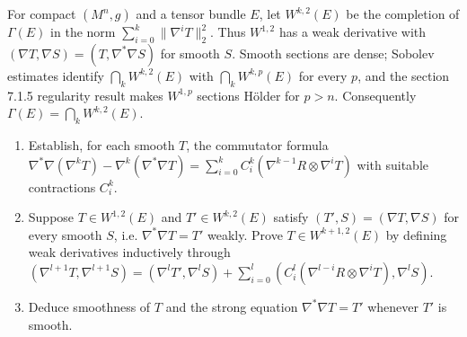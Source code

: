 \begin{remark}
  \label{rem:pet-ch9-exercise-9-6-4}
  For compact $(M^n,g)$ and a tensor bundle $E$, let $W^{k,2}(E)$ be the
  completion of $\Gamma(E)$ in the norm
  $\sum_{i=0}^k\|\nabla^iT\|_2^2$.  Thus $W^{1,2}$ has a weak derivative with
  $(\nabla T,\nabla S)=(T,\nabla^*\nabla S)$ for smooth $S$.  Smooth sections
  are dense; Sobolev estimates identify $\bigcap_kW^{k,2}(E)$ with
  $\bigcap_kW^{k,p}(E)$ for every $p$, and the section 7.1.5 regularity result
  makes $W^{1,p}$ sections H\"older for $p>n$.  Consequently
  $\Gamma(E)=\bigcap_kW^{k,2}(E)$.
  \begin{enumerate}
    \item[(1)] Establish, for each smooth $T$, the commutator formula
      $\nabla^*\nabla(\nabla^kT)-\nabla^k(\nabla^*\nabla T)
      =\sum_{i=0}^kC_i^k(\nabla^{k-1}R\otimes\nabla^iT)$ with suitable
      contractions $C_i^k$.
    \item[(2)] Suppose $T\in W^{1,2}(E)$ and $T'\in W^{k,2}(E)$ satisfy
      $(T',S)=(\nabla T,\nabla S)$ for every smooth $S$, i.e.
      $\nabla^*\nabla T=T'$ weakly.  Prove $T\in W^{k+1,2}(E)$ by defining
      weak derivatives inductively through
      $(\nabla^{l+1}T,\nabla^{l+1}S)=(\nabla^lT',\nabla^lS)
      +\sum_{i=0}^l(C_i^l(\nabla^{l-i}R\otimes\nabla^iT),\nabla^lS)$.
    \item[(3)] Deduce smoothness of $T$ and the strong equation
      $\nabla^*\nabla T=T'$ whenever $T'$ is smooth.
  \end{enumerate}
\end{remark}

